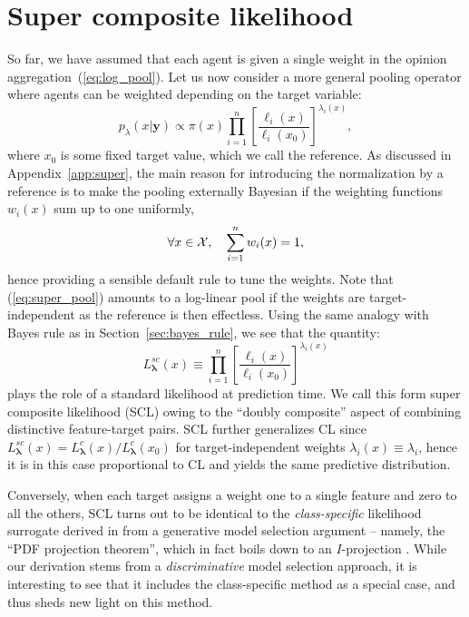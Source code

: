 \documentclass[english]{scrartcl}
\def\y{{\mathbf{y}}}
\newcommand{\blambda}{{\boldsymbol{\lambda}}}
\begin{document}
\section{Super composite likelihood}
\label{sec:super}

So far, we have assumed that each agent is given a single weight in the opinion aggregation~(\ref{eq:log_pool}). Let us now consider a more general pooling operator where agents can be weighted depending on the target variable:
\begin{equation}
\label{eq:super_pool}
p_\lambda(x|\y) \propto \pi(x) \prod_{i=1}^n \left[\frac{\ell_i(x)}{\ell_i(x_0)}\right]^{\lambda_i(x)},    
\end{equation}
where $x_0$ is some fixed target value, which we call the reference. As discussed in Appendix~\ref{app:super}, the main reason for introducing the normalization by a reference is to make the pooling externally Bayesian if the weighting functions~$w_i(x)$ sum up to one uniformly,
$$
\forall x\in{\cal X},\quad
\sum_{i=1}^n w_i(x) = 1,
$$
hence providing a sensible default rule to tune the weights. Note that (\ref{eq:super_pool}) amounts to a log-linear pool if the weights are target-independent as the reference is then effectless. Using the same analogy with Bayes rule as in Section~\ref{sec:bayes_rule}, we see that the quantity:
\begin{equation}
\label{eq:super_comp_lik}
L^{sc}_\blambda(x) \equiv 
\prod_{i=1}^n \left[\frac{\ell_i(x)}{\ell_i(x_0)}\right]^{\lambda_i(x)}
\end{equation} 
plays the role of a standard likelihood at prediction time. We call this form super composite likelihood (SCL) owing to the ``doubly composite'' aspect of combining distinctive feature-target pairs. SCL further generalizes CL since $L^{sc}_\blambda(x)=L^c_\blambda(x)/L^c_\blambda(x_0)$ for target-independent weights $\lambda_i(x)\equiv \lambda_i$, hence it is in this case proportional to CL and yields the same predictive distribution. 

Conversely, when each target assigns a weight one to a single feature and zero to all the others, SCL turns out to be identical to the {\em class-specific} likelihood surrogate derived in \cite{Baggenstoss-03} from a generative model selection argument -- namely, the ``PDF projection theorem'', which in fact boils down to an $I$-projection \cite{Minka-04}. While our derivation stems from a {\em discriminative} model selection approach, it is interesting to see that it includes the class-specific method as a special case, and thus sheds new light on this method.
\end{document}
